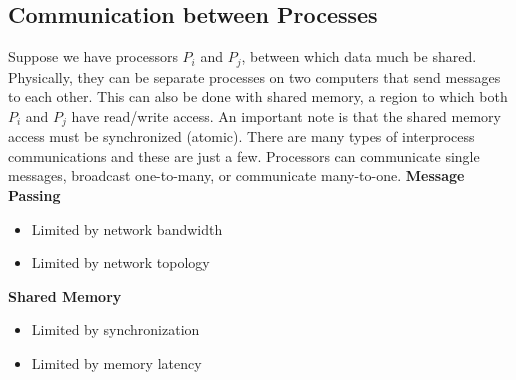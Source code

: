 \documentclass[letterpaper, 12pt]{math}
\begin{document}
\subsection*{Communication between Processes}
Suppose we have processors \( P_i \) and \( P_j \), between which data much be
shared. Physically, they can be separate processes on two computers that send
messages to each other. This can also be done with shared memory, a region to
which both \( P_i \) and \( P_j \) have read/write access. An important note
is that the shared memory access must be synchronized (atomic). There are many
types of interprocess communications and these are just a few. Processors can
communicate single messages, broadcast one-to-many, or communicate many-to-one.
\textbf{Message Passing}
\begin{itemize}
  \item Limited by network bandwidth
  \item Limited by network topology
\end{itemize}
\textbf{Shared Memory}
\begin{itemize}
  \item Limited by synchronization
  \item Limited by memory latency
\end{itemize}
\end{document}
